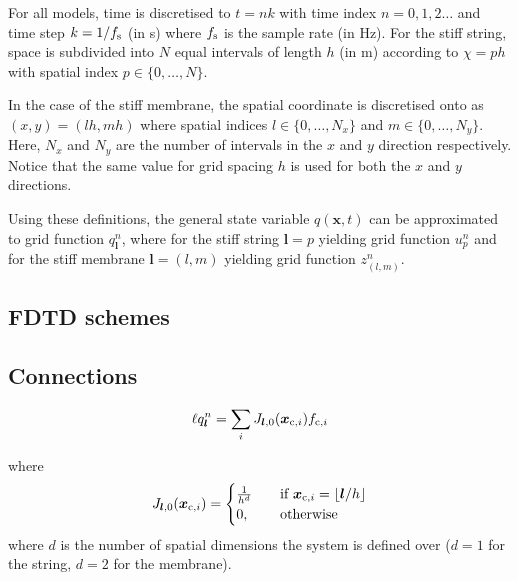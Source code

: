 \documentclass{article}
\begin{document}

For all models, time is discretised to $t = nk$ with time index $n = 0, 1, 2 \hdots$ and time step $k = 1/f_\text{s}$ (in s) where $f_\text{s}$ is the sample rate (in Hz). For the stiff string, space is subdivided into $N$ equal intervals of length $h$ (in m) according to $\chi = p h$ with spatial index $p \in \{0, \hdots, N\}$. 

In the case of the stiff membrane, the spatial coordinate is discretised onto  as $(x, y) = (l h, m h)$ where spatial indices $l \in \{0, \hdots, N_x\}$ and $m\in\{0, \hdots, N_y\}$. Here, $N_x$ and $N_y$ are the number of intervals in the $x$ and $y$ direction respectively. Notice that the same value for grid spacing $h$ is used for both the $x$ and $y$ directions. 

Using these definitions, the general state variable $q(\boldsymbol{x}, t)$ can be approximated to grid function $q_{\boldsymbol{l}}^n$, where for the stiff string $\boldsymbol{l} = p$ yielding grid function $u_p^n$ and for the stiff membrane $\boldsymbol{l} = (l, m)$ yielding grid function $z_{(l,m)}^n$.

\subsection{FDTD schemes}


\subsection{Connections}\label{sec:discConnections}
\begin{equation}
    \ell q_{\boldsymbol{l}}^n = \sum_i J_{\boldsymbol{l},0}(\boldsymbol{x}_{\text{c},i})f_{\text{c}, i}
\end{equation}

where 
\begin{equation}
    J_{\boldsymbol{l},0}(\boldsymbol{x}_{\text{c}, i}) = \begin{cases}
    \frac{1}{h^d}&\quad \text{if}\ \boldsymbol{x}_{\ctxt, i} = \floor[\boldsymbol{l}/h]\\
    0, &\quad\text{otherwise}
    \end{cases}
\end{equation}
where $d$ is the number of spatial dimensions the system is defined over ($d = 1$ for the string, $d=2$ for the membrane). 
\end{document}
